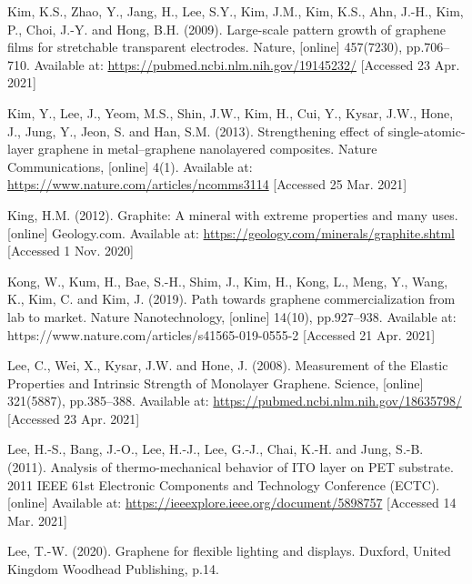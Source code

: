 \documentclass[a4paper,12pt]{article}
\numberwithin{equation}{section}
\numberwithin{figure}{section}
\begin{document}
\noindent Kim, K.S., Zhao, Y., Jang, H., Lee, S.Y., Kim, J.M., Kim, K.S., Ahn, J.-H., Kim, P., Choi, J.-Y. and Hong, B.H. (2009). Large-scale pattern growth of graphene films for stretchable transparent electrodes. Nature, [online] 457(7230), pp.706–710. Available at: \url{https://pubmed.ncbi.nlm.nih.gov/19145232/} [Accessed 23 Apr. 2021]\vspace{\baselineskip}

\noindent Kim, Y., Lee, J., Yeom, M.S., Shin, J.W., Kim, H., Cui, Y., Kysar, J.W., Hone, J., Jung, Y., Jeon, S. and Han, S.M. (2013). Strengthening effect of single-atomic-layer graphene in metal–graphene nanolayered composites. Nature Communications, [online] 4(1). Available at: \url{https://www.nature.com/articles/ncomms3114} [Accessed 25 Mar. 2021]\vspace{\baselineskip}

\noindent King, H.M. (2012). Graphite: A mineral with extreme properties and many uses. [online] Geology.com. Available at: \url{https://geology.com/minerals/graphite.shtml} [Accessed 1 Nov. 2020]\vspace{\baselineskip}

\noindent Kong, W., Kum, H., Bae, S.-H., Shim, J., Kim, H., Kong, L., Meng, Y., Wang, K., Kim, C. and Kim, J. (2019). Path towards graphene commercialization from lab to market. Nature Nanotechnology, [online] 14(10), pp.927–938. Available at: https://www.nature.com/articles/s41565-019-0555-2 [Accessed 21 Apr. 2021] \vspace{\baselineskip}

\noindent Lee, C., Wei, X., Kysar, J.W. and Hone, J. (2008). Measurement of the Elastic Properties and Intrinsic Strength of Monolayer Graphene. Science, [online] 321(5887), pp.385–388. Available at: \url{https://pubmed.ncbi.nlm.nih.gov/18635798/} [Accessed 23 Apr. 2021]\vspace{\baselineskip}

\noindent Lee, H.-S., Bang, J.-O., Lee, H.-J., Lee, G.-J., Chai, K.-H. and Jung, S.-B. (2011). Analysis of thermo-mechanical behavior of ITO layer on PET substrate. 2011 IEEE 61st Electronic Components and Technology Conference (ECTC). [online] Available at: \url{https://ieeexplore.ieee.org/document/5898757} [Accessed 14 Mar. 2021]\vspace{\baselineskip}

\noindent Lee, T.-W. (2020). Graphene for flexible lighting and displays. Duxford, United Kingdom Woodhead Publishing, p.14.\vspace{\baselineskip}
\end{document}

